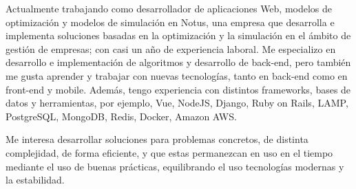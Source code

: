 

\begin{cvparagraph}

Actualmente trabajando como desarrollador de aplicaciones Web, modelos de optimización y modelos de simulación en Notus, una empresa que desarrolla e implementa soluciones basadas en la optimización y la simulación en el ámbito de gestión de empresas; con casi un año de experiencia laboral. Me especializo en desarrollo e implementación de algoritmos y desarrollo de back-end, pero también me gusta aprender y trabajar con nuevas tecnologías, tanto en back-end como en front-end y mobile. Además, tengo experiencia con distintos frameworks, bases de datos y herramientas, por ejemplo, Vue, NodeJS, Django, Ruby on Rails, LAMP, PostgreSQL, MongoDB, Redis, Docker, Amazon AWS.

Me interesa desarrollar soluciones para problemas concretos, de distinta complejidad, de forma eficiente, y que estas permanezcan en uso en el tiempo mediante el uso de buenas prácticas, equilibrando el uso tecnologías modernas y la estabilidad.

\end{cvparagraph}
